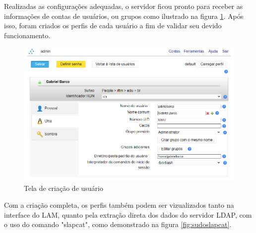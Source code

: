 Realizadas as configurações adequadas, o servidor ficou pronto para receber as informações de contas de usuários, ou grupos como ilustrado na figura \ref{fig:LAM6}. Após isso, foram criados os perfis de cada usuário a fim de validar seu devido funcionamento.

\begin{figure}[h]
	\centering
	\includegraphics[scale=0.4]{textuais/CriaçãoUsuario.png}
	\caption{Tela de criação de usuário
	\label{fig:LAM6}}
\end{figure}

Com a criação completa, os perfis também podem ser vizualizados tanto na interface do LAM, quanto pela extração direta dos dados do servidor LDAP, com o uso do comando "slapcat", como demonstrado na figura \ref{fig:sudoslapcat}.